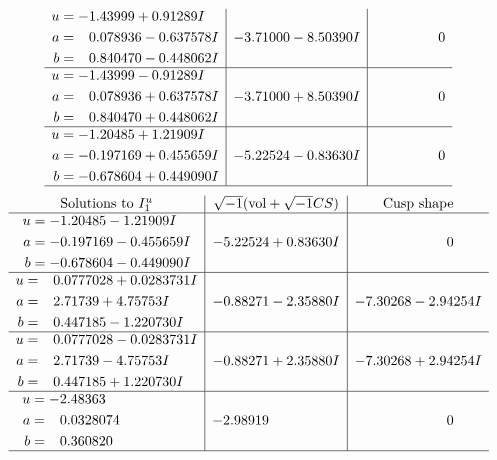 \documentclass[1p]{elsarticle_modified}
\theoremstyle{definition}
\newcommand{\I}{\sqrt{-1}}
\begin{document}
$$\begin{array}{c|c|c}
\begin{aligned}
u &= -1.43999 + 0.91289 I \\
a &= \phantom{-}0.078936 - 0.637578 I \\
b &= \phantom{-}0.840470 - 0.448062 I\end{aligned}
 & -3.71000 - 8.50390 I & \phantom{-0.000000 } 0 \\ \hline\begin{aligned}
u &= -1.43999 - 0.91289 I \\
a &= \phantom{-}0.078936 + 0.637578 I \\
b &= \phantom{-}0.840470 + 0.448062 I\end{aligned}
 & -3.71000 + 8.50390 I & \phantom{-0.000000 } 0 \\ \hline\begin{aligned}
u &= -1.20485 + 1.21909 I \\
a &= -0.197169 + 0.455659 I \\
b &= -0.678604 + 0.449090 I\end{aligned}
 & -5.22524 - 0.83630 I & \phantom{-0.000000 } 0\\
 \hline 
 \end{array}$$\newpage$$\begin{array}{c|c|c}  
\text{Solutions to }I^u_{1}& \I (\text{vol} + \sqrt{-1}CS) & \text{Cusp shape}\\
 \hline 
\begin{aligned}
u &= -1.20485 - 1.21909 I \\
a &= -0.197169 - 0.455659 I \\
b &= -0.678604 - 0.449090 I\end{aligned}
 & -5.22524 + 0.83630 I & \phantom{-0.000000 } 0 \\ \hline\begin{aligned}
u &= \phantom{-}0.0777028 + 0.0283731 I \\
a &= \phantom{-}2.71739 + 4.75753 I \\
b &= \phantom{-}0.447185 - 1.220730 I\end{aligned}
 & -0.88271 - 2.35880 I & -7.30268 - 2.94254 I \\ \hline\begin{aligned}
u &= \phantom{-}0.0777028 - 0.0283731 I \\
a &= \phantom{-}2.71739 - 4.75753 I \\
b &= \phantom{-}0.447185 + 1.220730 I\end{aligned}
 & -0.88271 + 2.35880 I & -7.30268 + 2.94254 I \\ \hline\begin{aligned}
u &= -2.48363\phantom{ +0.000000I} \\
a &= \phantom{-}0.0328074\phantom{ +0.000000I} \\
b &= \phantom{-}0.360820\phantom{ +0.000000I}\end{aligned}
 & -2.98919\phantom{ +0.000000I} & \phantom{-0.000000 } 0\\
 \hline 
 \end{array}$$\newpage\newpage\renewcommand{\arraystretch}{1}
\end{document}
